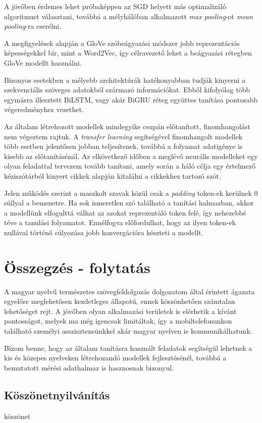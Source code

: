 A jövőben érdemes lehet próbaképpen az SGD helyett más optimalizáló algoritmust választani, továbbá a mélyhálóban alkalmazott \textit{max pooling}-ot \textit{mean pooling}-ra cserélni.

A megfigyelések alapján a GloVe szóbeágyazási módszer jobb reprezentációs képességekkel bír, mint a Word2Vec, így célravezető lehet a beágyazási rétegben GloVe modellt használni.

Bizonyos esetekben a mélyebb architektúrák hatékonyabban tudják kinyerni a szekvenciális szöveges adatokból származó információkat. Ebből kifolyólag több egymásra illesztett BiLSTM, vagy akár BiGRU réteg együttes tanítása pontosabb végeredményhez vezethet.

Az általam létrehozott modellek mindegyike csupán előtanított, finomhangolást nem végeztem rajtuk. A \textit{transfer learning} segítségével finomhangolt modellek több esetben jelentősen jobban teljesítenek, továbbá a folyamat adatigénye is kisebb az előtanításénál. Az elkövetkező időben a meglévő neurális modelleket egy olyan feladattal tervezem tovább tanítani, amely során a háló célja egy értelmező kéziszótárból kinyert cikkek alapján kitalálni a cikkekhez tartozó szót.

Jelen működés szerint a maszkolt szavak közül csak a \textit{padding} token-ek kerülnek 0 súllyal a bemenetre. Ha sok ismeretlen szó található a tanítási halmazban, akkor a modellünk elfogulttá válhat az azokat reprezentáló token felé, így nehezebbé téve a tanulási folyamatot. Ennélfogva előfordulhat, hogy az ilyen token-ek nullával történő súlyozása jobb konvergációra készteti a modellt.


\chapter*{Összegzés - folytatás}

A magyar nyelvű természetes szövegfeldolgozás dolgozatom által érintett ágazata egyelőre meglehetősen kezdetleges állapotú, ennek köszönhetően számtalan lehetőséget rejt. A jövőben olyan alkalmazási területek is elérhetik a kívánt pontosságot, melyek ma még igencsak limitáltak, így a mobiltelefonunkon található személyi asszisztensünkkel akár magyar nyelven is kommunikálhatunk.

Bízom benne, hogy az általam tanításra használt feladatok segítségül lehetnek a kis és közepes nyelveken létrehozandó modellek fejlesztésénél, továbbá a bemutatott mérési adathalmaz is hasznosnak bizonyul.



\section{Köszönetnyilvánítás}

köszönet